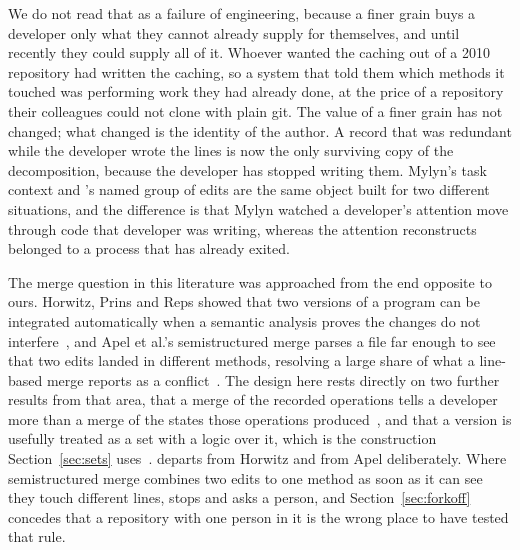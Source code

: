 We do not read that as a failure of engineering, because a finer grain buys a
developer only what they cannot already supply for themselves, and until recently
they could supply all of it. Whoever wanted the caching out of a 2010 repository
had written the caching, so a system that told them which methods it touched was
performing work they had already done, at the price of a repository their
colleagues could not clone with plain git. The value of a finer grain has not
changed; what changed is the identity of the author. A record that was redundant
while the developer wrote the lines is now the only surviving copy of the
decomposition, because the developer has stopped writing them. Mylyn's task context and \sgt{}'s named group of
edits are the same object built for two different situations, and the difference is
that Mylyn watched a developer's attention move through code that developer was
writing, whereas the attention \sgt{} reconstructs belonged to a process that has
already exited.

The merge question in this literature was approached from the end opposite to ours.
Horwitz, Prins and Reps showed that two versions of a program can be integrated
automatically when a semantic analysis proves the changes do not
interfere~\cite{horwitz1989}, and Apel et al.'s semistructured merge parses a file
far enough to see that two edits landed in different methods, resolving a large
share of what a line-based merge reports as a conflict~\cite{apel2011}. The design
here rests directly on two further results from that area, that a merge of the
recorded operations tells a developer more than a merge of the states those
operations produced~\cite{lippe1992}, and that a version is usefully treated as a
set with a logic over it, which is the construction Section~\ref{sec:sets}
uses~\cite{zeller1997}. \sgt{} departs from Horwitz and from Apel deliberately.
Where semistructured merge combines two edits to one
method as soon as it can see they touch different lines, \sgt{} stops and asks a
person, and Section~\ref{sec:forkoff} concedes that a repository with one person in
it is the wrong place to have tested that rule.

